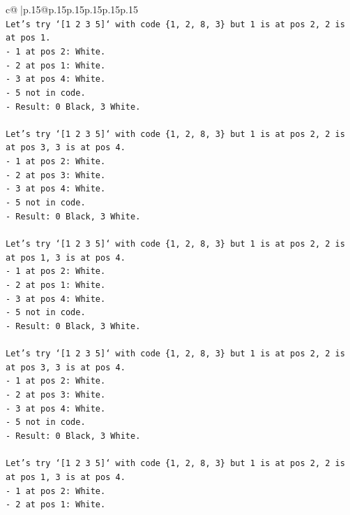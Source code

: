 \documentclass{article}
\begin{document}
{\begin{supertabular}{c@{$\;$}|p{.15\linewidth}@{}p{.15\linewidth}p{.15\linewidth}p{.15\linewidth}p{.15\linewidth}p{.15\linewidth}}
{{{\\ 
\texttt{Let's try `{[}1 2 3 5{]}` with code \{1, 2, 8, 3\} but 1 is at pos 2, 2 is at pos 1.} \\
\texttt{{-} 1 at pos 2: White.} \\
\texttt{{-} 2 at pos 1: White.} \\
\texttt{{-} 3 at pos 4: White.} \\
\texttt{{-} 5 not in code.} \\
\texttt{{-} Result: 0 Black, 3 White.} \\
\\ 
\texttt{Let's try `{[}1 2 3 5{]}` with code \{1, 2, 8, 3\} but 1 is at pos 2, 2 is at pos 3, 3 is at pos 4.} \\
\texttt{{-} 1 at pos 2: White.} \\
\texttt{{-} 2 at pos 3: White.} \\
\texttt{{-} 3 at pos 4: White.} \\
\texttt{{-} 5 not in code.} \\
\texttt{{-} Result: 0 Black, 3 White.} \\
\\ 
\texttt{Let's try `{[}1 2 3 5{]}` with code \{1, 2, 8, 3\} but 1 is at pos 2, 2 is at pos 1, 3 is at pos 4.} \\
\texttt{{-} 1 at pos 2: White.} \\
\texttt{{-} 2 at pos 1: White.} \\
\texttt{{-} 3 at pos 4: White.} \\
\texttt{{-} 5 not in code.} \\
\texttt{{-} Result: 0 Black, 3 White.} \\
\\ 
\texttt{Let's try `{[}1 2 3 5{]}` with code \{1, 2, 8, 3\} but 1 is at pos 2, 2 is at pos 3, 3 is at pos 4.} \\
\texttt{{-} 1 at pos 2: White.} \\
\texttt{{-} 2 at pos 3: White.} \\
\texttt{{-} 3 at pos 4: White.} \\
\texttt{{-} 5 not in code.} \\
\texttt{{-} Result: 0 Black, 3 White.} \\
\\ 
\texttt{Let's try `{[}1 2 3 5{]}` with code \{1, 2, 8, 3\} but 1 is at pos 2, 2 is at pos 1, 3 is at pos 4.} \\
\texttt{{-} 1 at pos 2: White.} \\
\texttt{{-} 2 at pos 1: White.} \\
}}}
\end{supertabular}}
\end{document}
